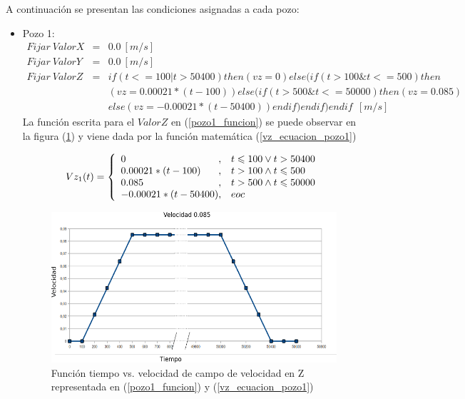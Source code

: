 \documentclass[10pt,a4paper,final]{article}
\begin{document}
A continuación se presentan las condiciones asignadas a cada pozo:
\begin{itemize}
\item Pozo 1: 
\begin{eqnarray} \label{pozo1_funcion}
\nonumber
Fijar~ValorX&=&0.0~[m/s]\\
\nonumber
Fijar~ValorY&=&0.0~[m/s]\\
Fijar~ValorZ&=& if(t<=100 | t>50400)then(vz=0)else(if(t>100 \& t<=500)then\\
\nonumber
&&(vz=0.00021*(t-100))else(if(t>500 \& t<=50000)then(vz=0.085)\\&&
\nonumber
else(vz=-0.00021*(t-50400))endif)endif)endif~~[m/s]
\end{eqnarray}
La función escrita para el $ValorZ$ en (\ref{pozo1_funcion}) se puede observar en la figura (\ref{grafica1_0085}) y viene dada por la función matemática (\ref{vz_ecuacion_pozo1})

%
\begin{equation}\label{vz_ecuacion_pozo1}
Vz_1(t) = \left\{
\begin{array}{l@{,\quad}l}
0 & t\leqslant 100 \vee t > 50400 \\
0.00021*(t-100) & t > 100 \wedge t\leqslant 500 \\
0.085 & t > 500 \wedge t\leqslant 50000 \\
-0.00021*(t-50400) & eoc
\end{array}
\right.
\end{equation}
%

\begin{figure}[tbhp]
\centerline{\includegraphics[scale=0.3]{graficas/0085}}
\caption{Función tiempo vs. velocidad de campo de velocidad en Z representada en (\ref{pozo1_funcion}) y (\ref{vz_ecuacion_pozo1})}
\label{grafica1_0085}
\end{figure}


\end{itemize}
\end{document}
